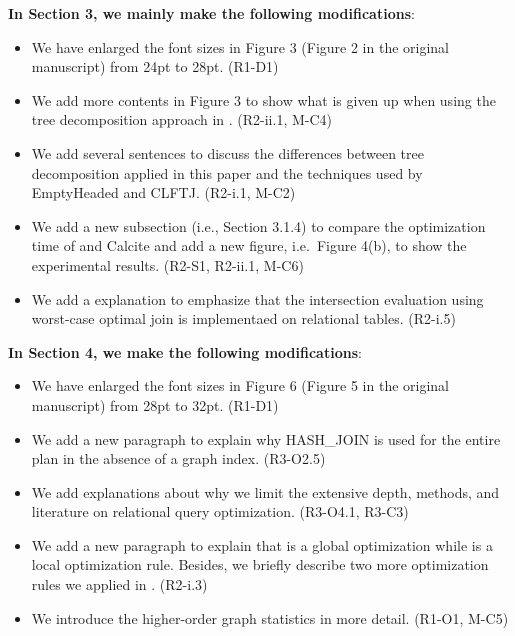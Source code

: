 \textbf{In Section 3, we mainly make the following modifications}:
\begin{itemize}
	\item We have enlarged the font sizes in Figure 3 (Figure 2 in the original manuscript) from 24pt to 28pt. (R1-D1)
	\item We add more contents in Figure 3 to show what is given up when using the tree decomposition approach in \name. (R2-ii.1, M-C4)
	\item We add several sentences to discuss the differences between tree decomposition applied in this paper and the techniques used by EmptyHeaded and CLFTJ. (R2-i.1, M-C2)
	\item We add a new subsection (i.e., Section 3.1.4) to compare the optimization time of \name and Calcite and add a new figure, i.e.~Figure 4(b), to show the experimental results. (R2-S1, R2-ii.1, M-C6)
	\item We add a explanation to emphasize that the intersection evaluation using worst-case optimal join is implementaed on relational tables. (R2-i.5)
\end{itemize}

\textbf{In Section 4, we make the following modifications}:
\begin{itemize}
	\item We have enlarged the font sizes in Figure 6 (Figure 5 in the original manuscript) from 28pt to 32pt. (R1-D1)
	\item We add a new paragraph to explain why HASH\_JOIN is used for the entire plan in the absence of a graph index. (R3-O2.5)
	\item We add explanations about why we limit the extensive depth, methods, and literature on relational query optimization. (R3-O4.1, R3-C3)
	\item We add a new paragraph to explain that \filterrule is a global optimization while \fusionrule is a local optimization rule. Besides, we briefly describe two more optimization rules we applied in \name. (R2-i.3)
	\item We introduce the higher-order graph statistics in more detail. (R1-O1, M-C5)
\end{itemize}

